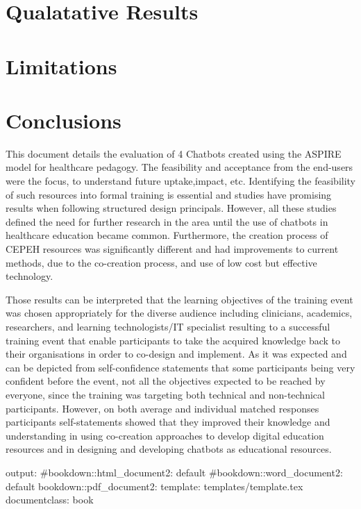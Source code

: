 \documentclass[a4paper, nobind]{templates/ociamthesis}
\begin{document}
\hypertarget{qualatative-results}{%
\section{Qualatative Results}\label{qualatative-results}}

\hypertarget{limitations}{%
\section{Limitations}\label{limitations}}

\hypertarget{conclusions}{%
\section{Conclusions}\label{conclusions}}

This document details the evaluation of 4 Chatbots created using the ASPIRE model for healthcare pedagogy. The feasibility and acceptance from the end-users were the focus, to understand future uptake,impact, etc. Identifying the feasibility of such resources into formal training is essential and studies have promising results when following structured design principals. However, all these studies defined the need for further research in the area until the use of chatbots in healthcare education became common. Furthermore, the creation process of CEPEH resources was significantly different and had improvements to current methods, due to the co-creation process, and use of low cost but effective technology.

Those results can be interpreted that the learning objectives of the training event was chosen appropriately for the diverse audience including clinicians, academics, researchers, and learning technologists/IT specialist resulting to a successful training event that enable participants to take the acquired knowledge back to their organisations in order to co-design and implement.
As it was expected and can be depicted from self-confidence statements that some participants being very confident before the event, not all the objectives expected to be reached by everyone, since the training was targeting both technical and non-technical participants.
However, on both average and individual matched responses participants self-statements showed that they improved their knowledge and understanding in using co-creation approaches to develop digital education resources and in designing and developing chatbots as educational resources.

output:
\#bookdown::html\_document2: default
\#bookdown::word\_document2: default
bookdown::pdf\_document2:
template: templates/template.tex
documentclass: book
\end{document}
